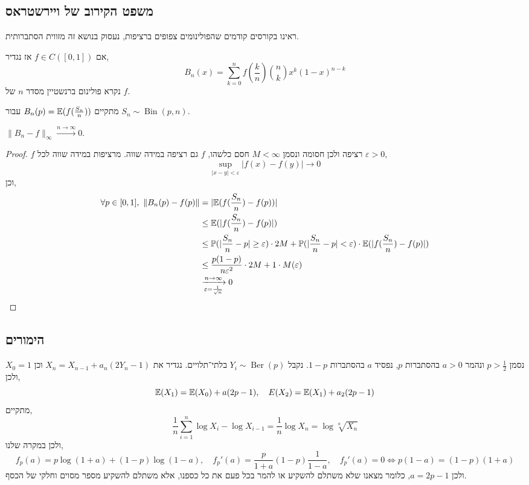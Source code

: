 \subsection{משפט הקירוב של ויירשטראס}
ראינו בקורסים קודמים שהפולינומים צפופים ברציפות, נעסוק בנושא זה מזווית הסתברותית.
\begin{definition}
	אם $f \in C([0, 1])$ אז נגדיר,
	\[
		B_n(x)
		= \sum_{k = 0}^n f\left(\frac{k}{n}\right) \binom{n}{k} x^k {(1 - x)}^{n - k}
	\]
	נקרא פולינום ברנשטיין מסדר $n$ של $f$.
\end{definition}
\begin{remark}
	מתקיים $B_n(p) = \mathbb{E}(f(\frac{S_n}{n}))$ עבור $S_n \sim \operatorname{Bin}(p, n)$.
\end{remark}
\begin{proposition}
	$\lVert B_n - f \rVert_\infty \xrightarrow{n \to \infty} 0$.
\end{proposition}
\begin{proof}
	$f$ רציפה ולכן חסומה ונסמן $M < \infty$ חסם כלשהו, $f$ גם רציפה במידה שווה.
	מרציפות במידה שווה לכל $\varepsilon > 0$,
	\[
		\sup_{|x - y| < \varepsilon} |f(x) - f(y)| \to 0
	\]
	וכן,
	\begin{align*}
		\forall p \in [0, 1],\ 
		\lVert B_n(p) - f(p) \rVert
		& = |\EE(f(\frac{S_n}{n}) - f(p))| \\
		& \le \EE(|f(\frac{S_n}{n}) - f(p)|) \\
		& \le \PP(|\frac{S_n}{n} - p| \ge \varepsilon) \cdot 2M + \PP(|\frac{S_n}{n} - p| < \varepsilon) \cdot \EE(| f(\frac{S_n}{n}) - f(p) |) \\
		& \le \frac{p(1 - p)}{n \varepsilon^2} \cdot 2M + 1 \cdot M(\varepsilon) \\
		& \xrightarrow[\varepsilon = \frac{1}{\sqrt{n}}]{n \to \infty} 0
	\end{align*}
\end{proof}

\subsection{הימורים}
נסמן $p > \frac{1}{2}$ ונהמר $a > 0$ בהסתברות $p$, נפסיד $a$ בהסתברות $1 - p$.
נקבל $Y_i \sim \operatorname{Ber}(p)$ בלתי־תלויים.
נגדיר את $X_n = X_{n - 1} + a_n(2Y_n - 1)$ וכן $X_0 = 1$ ולכן,
\[
	\mathbb{E}(X_1)
	= \mathbb{E}(X_0) + a(2p - 1),
	\quad
	E(X_2)
	= \mathbb{E}(X_1) + a_2(2p - 1)
\]
מתקיים,
\[
	\frac{1}{n} \sum_{i = 1}^n \log X_i - \log X_{i - 1}
	= \frac{1}{n} \log X_n
	= \log \sqrt[n]{X_n}
\]
ולכן במקרה שלנו,
\[
	f_p(a) = p \log (1 + a) + (1 - p) \log (1 - a),
	\quad
	f_p'(a) = \frac{p}{1 + a}  (1 - p) \frac{1}{1 - a},
	\quad
	f_p'(a) = 0
	\iff p(1 - a) = (1 - p) (1 + a)
\]
ולכן $a = 2p - 1$, כלומר מצאנו שלא משתלם להשקיע או להמר בכל פעם את כל כספנו, אלא משתלם להשקיע מספר מסוים וחלקי של הכסף.

